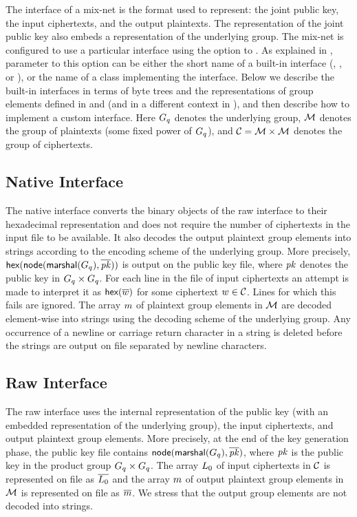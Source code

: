 \documentclass[11pt]{article}
\begin{document}
The interface of a mix-net is the format used to represent: the joint
public key, the input ciphertexts, and the output plaintexts. The
representation of the joint public key also embeds a representation of
the underlying group. The \veri mix-net is configured to use a
particular interface using the  option to \vmni{}. As
explained in , parameter to this option can be either
the short name of a built-in interface (, , or
), or the name of a class implementing the
interface. Below we describe the built-in interfaces in terms of byte
trees and the representations of group elements defined in
 and  (and in a different context in
\cite{vmnv}), and then describe how to implement a custom
interface. Here $G_{q}$ denotes the underlying group, $\mathcal{M}$ denotes
the group of plaintexts (some fixed power of $G_{q}$), and
$\mathcal{C}=\mathcal{M}\times\mathcal{M}$ denotes the group of ciphertexts.

\subsection{Native Interface}

The native interface converts the binary objects of the raw interface
to their hexadecimal representation and does not require the number of
ciphertexts in the input file to be available. It also decodes the
output plaintext group elements into strings according to the encoding
scheme of the underlying group. More precisely,
$\textsf{hex}(\textsf{node}(\textsf{marshal}(G_{q}),\overline{\mathit{pk}}))$ is output on the public key
file, where $\mathit{pk}$ denotes the public key in $G_{q}\times G_{q}$. For each
line in the file of input ciphertexts an attempt is made to interpret
it as $\textsf{hex}(\overline{w})$ for some ciphertext
$w\in\mathcal{C}$. Lines for which this fails are ignored. The array
$m$ of plaintext group elements in $\mathcal{M}$ are decoded
element-wise into strings using the decoding scheme of the underlying
group. Any occurrence of a newline or carriage return character in a
string is deleted before the strings are output on file separated by
newline characters.

\subsection{Raw Interface}

The raw interface uses the internal representation of the public key
(with an embedded representation of the underlying group), the input
ciphertexts, and output plaintext group elements. More precisely, at
the end of the key generation phase, the public key file contains
$\textsf{node}(\textsf{marshal}(G_{q}),\overline{\mathit{pk}})$, where $\mathit{pk}$ is the public key in the
product group $G_{q}\times G_{q}$. The array $L_{0}$ of input
ciphertexts in $\mathcal{C}$ is represented on file as $\overline{L_{0}}$ and
the array $m$ of output plaintext group elements in $\mathcal{M}$ is
represented on file as $\overline{m}$. We stress that the output group
elements are not decoded into strings.
\end{document}
